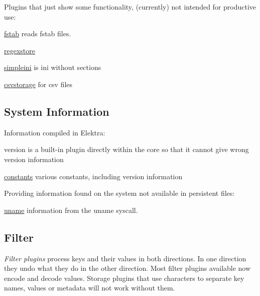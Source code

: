 Plugins that just show some functionality, (currently) not intended for productive use\+:


\begin{DoxyItemize}
\item \hyperlink{md_src_plugins_fstab_README_src_plugins_fstab_README_md}{fstab} reads fstab files.
\item \hyperlink{md_src_plugins_regexstore_README_src_plugins_regexstore_README_md}{regexstore}
\item \hyperlink{md_src_plugins_simpleini_README_src_plugins_simpleini_README_md}{simpleini} is ini without sections
\item \hyperlink{md_src_plugins_csvstorage_README_src_plugins_csvstorage_README_md}{csvstorage} for csv files
\end{DoxyItemize}

\subsection*{System Information}

Information compiled in Elektra\+:
\begin{DoxyItemize}
\item version is a built-\/in plugin directly within the core so that it cannot give wrong version information
\item \hyperlink{md_src_plugins_constants_README_src_plugins_constants_README_md}{constants} various constants, including version information
\end{DoxyItemize}

Providing information found on the system not available in persistent files\+:


\begin{DoxyItemize}
\item \hyperlink{md_src_plugins_uname_README_src_plugins_uname_README_md}{uname} information from the uname syscall.
\end{DoxyItemize}

\subsection*{Filter}

{\itshape Filter plugins} process keys and their values in both directions. In one direction they undo what they do in the other direction. Most filter plugins available now encode and decode values. Storage plugins that use characters to separate key names, values or metadata will not work without them.


